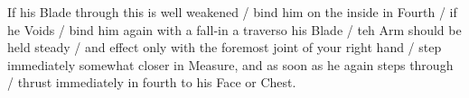 
If his Blade through this is well weakened / bind him on the inside in
Fourth / if he Voids / bind him again with a fall-in a traverso his
Blade / teh Arm should be held steady / and effect only with the
foremost joint of your right hand / step immediately somewhat closer
in Measure, and as soon as he again steps through / thrust immediately
in fourth to his Face or Chest.